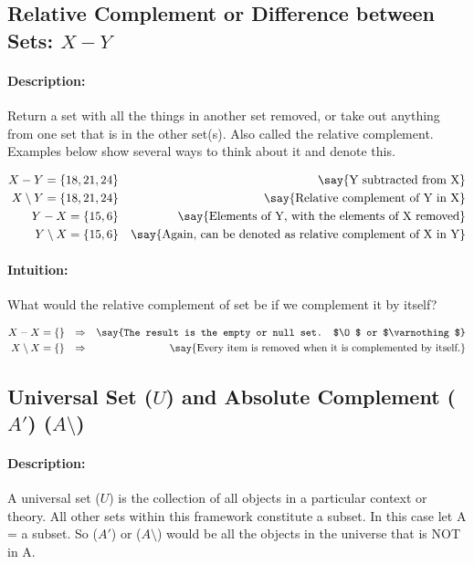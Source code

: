 \documentclass[12pt]{article}
\begin{document}
  \subsection{Relative Complement or Difference between Sets: $X - Y$}
  \paragraph{Description:} Return a set with all the things in another set removed, or take out anything from one set that is in the other set(s). Also called the relative complement. Examples below show several ways to think about it and denote this. %

  \begin{align}
    X - Y = \{18, 21, 24\} &&
    \text{\say{Y subtracted from X}} \\
    X \setminus Y = \{18, 21, 24\} &&
    \text{\say{Relative complement of Y in X}} \\
    Y - X = \{15, 6\} &&
    \text{\say{Elements of Y, with the elements of X removed}} \\
    Y \setminus X = \{15, 6\} &&
    \text{\say{Again, can be denoted as relative complement of X in Y}}
  \end{align}%

  \paragraph{Intuition:} What would the relative complement of set be if we complement it by itself?

  \begin{align}
    X - X = \{\} && \Rightarrow &&
    \text{\say{The result is the empty or null set. $\O$ or $\varnothing$}} \\
    X \setminus X = \{\} && \Rightarrow &&
    \text{\say{Every item is removed when it is complemented by itself.}}
  \end{align}%


  \subsection{Universal Set ($U$) and Absolute Complement ($A'$) ($A\setminus$)}

  \paragraph{Description:}
  A universal set ($U$) is the collection of all objects in a particular context or theory. All other sets within this framework constitute a subset. In this case let A = a subset. So ($A'$) or ($A\setminus$) would be all the objects in the universe that is NOT in A.
\end{document}
